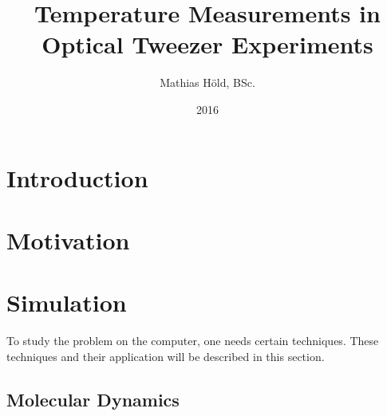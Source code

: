 \documentclass[12pt]{article}
\begin{document}
\title{Temperature Measurements in Optical Tweezer Experiments}
\author{Mathias H\"old, BSc.}
\date{2016}
\maketitle
\thispagestyle{empty}
\newpage
\section{Introduction}





\newpage
\section{Motivation}






\newpage
\section{Simulation}
To study the problem on the computer, one needs certain techniques. These techniques and their application will be described in this section.

\subsection{Molecular Dynamics}
\end{document}
